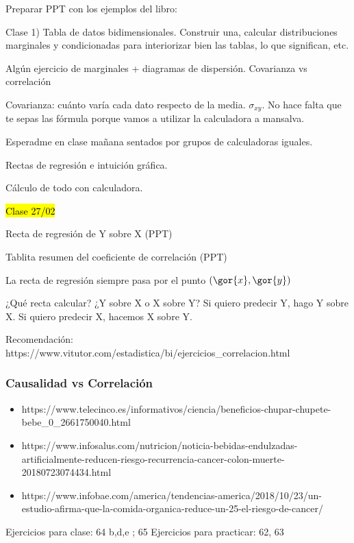 Preparar PPT con los ejemplos del libro:

Clase 1) Tabla de datos bidimensionales. Construir una, calcular distribuciones marginales y condicionadas para interiorizar bien las tablas, lo que significan, etc.

Algún ejercicio de marginales + diagramas de dispersión. Covarianza vs correlación

Covarianza: cuánto varía cada dato respecto de la media. $\sigma_{xy}$. No hace falta que te sepas las fórmula porque vamos a utilizar la calculadora a mansalva. 

Esperadme en clase mañana sentados por grupos de calculadoras iguales.

Rectas de regresión e intuición gráfica.

Cálculo de todo con calculadora.

\hl{Clase 27/02}

Recta de regresión de Y sobre X (PPT)

Tablita resumen del coeficiente de correlación (PPT)

La recta de regresión siempre pasa por el punto $(\gor{x},\gor{y})$

¿Qué recta calcular? ¿Y sobre X o X sobre Y? Si quiero predecir Y, hago Y sobre X. Si quiero predecir X, hacemos X sobre Y.

Recomendación: https://www.vitutor.com/estadistica/bi/ejercicios\_correlacion.html

\subsubsection{Causalidad vs Correlación}

\begin{itemize}
	\item https://www.telecinco.es/informativos/ciencia/beneficios-chupar-chupete-bebe_0_2661750040.html
	\item https://www.infosalus.com/nutricion/noticia-bebidas-endulzadas-artificialmente-reducen-riesgo-recurrencia-cancer-colon-muerte-20180723074434.html
	\item https://www.infobae.com/america/tendencias-america/2018/10/23/un-estudio-afirma-que-la-comida-organica-reduce-un-25-el-riesgo-de-cancer/
\end{itemize}

Ejercicios para clase: 64 b,d,e ; 65
Ejercicios para practicar: 62, 63



